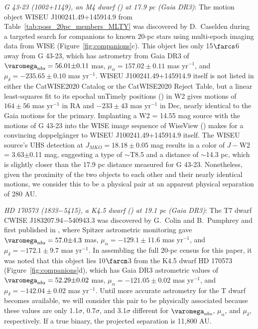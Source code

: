 \documentclass[twocolumn,tighten,twocolappendix]{aastex631}
\begin{document}
{\it G 43-23 (1002+1149), an M4 dwarf (\citealt{reid1995}) at 17.9 pc (Gaia DR3)}: The motion object WISEU J100241.49+145914.9 from Table~\ref{tab:poss_20pc_members_MLTY} was discovered by D.\ Caselden during a targeted search for companions to known 20-pc stars using multi-epoch imaging data from WISE (Figure~\ref{fig:companions}c). This object lies only 15$\farcs$6 away from G 43-23, which has astrometry from Gaia DR3 of $\varomega_{abs} = 56.01{\pm}0.11$ mas, $\mu_\alpha = 157.02{\pm}0.11$ mas yr$^{-1}$, and $\mu_\delta = -235.65{\pm}0.10$ mas yr$^{-1}$. WISEU J100241.49+145914.9 itself is not listed in either the CatWISE2020 Catalog or the CatWISE2020 Reject Table, but a linear least-squares fit to its epochal unTimely positions (\citealt{meisner2023-untimely}) in W2 gives motions of $164{\pm}56$ mas yr$^{-1}$ in RA and $-233{\pm}43$ mas yr$^{-1}$ in Dec, nearly identical to the Gaia motions for the primary. Implanting a W2 = 14.55 mag source with the motions of G 43-23 into the WISE image sequence of WiseView (\citealt{caselden2018}) makes for a convincing doppelg{\"a}nger to WISEU J100241.49+145914.9 itself. The WISEU source's UHS detection at $J_{MKO} = 18.18{\pm}0.05$ mag results in a color of $J-$W2 = 3.63$\pm$0.11 mag, suggesting a type of $\sim$T8.5 and a distance of $\sim$14.3 pc, which is slightly closer than the 17.9 pc distance measured for G 43-23. Nonetheless, given the proximity of the two objects to each other and their nearly identical motions, we consider this to be a physical pair at an apparent physical separation of 280 AU. 

{\it HD 170573 (1833$-$5415), a K4.5 dwarf (\citealt{gray2006}) at 19.1 pc (Gaia DR3)}: The T7 dwarf CWISE J183207.94$-$540943.3 was discovered by G.\ Colin and B.\ Pumphrey and first published in \cite{kirkpatrick2021}, where Spitzer astrometric monitoring gave $\varomega_{abs} = 57.0{\pm}4.3$ mas, $\mu_\alpha = -129.1{\pm}11.6$ mas yr$^{-1}$, and $\mu_\delta = -172.1{\pm}9.7$ mas yr$^{-1}$. In assembling the full 20-pc census for this paper, it was noted that this object lies 10$\farcm$3 from the K4.5 dwarf HD 170573 (Figure~\ref{fig:companions}d), which has Gaia DR3 astrometric values of $\varomega_{abs} = 52.29{\pm}0.02$ mas, $\mu_\alpha = -121.05{\pm}0.02$ mas yr$^{-1}$, and $\mu_\delta = -142.04{\pm}0.02$ mas yr$^{-1}$. Until more accurate astrometry for the T dwarf becomes available, we will consider this pair to be physically associated because these values are only 1.1$\sigma$, 0.7$\sigma$, and 3.1$\sigma$ different for $\varomega_{abs}$, $\mu_\alpha$, and $\mu_\delta$, respectively. If a true binary, the projected separation is 11,800 AU.
\end{document}
